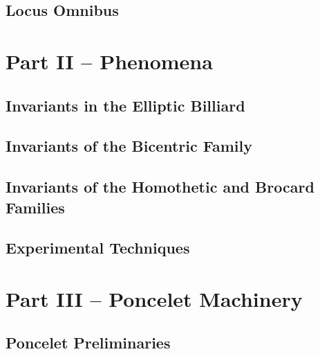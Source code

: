 \documentclass{book}
\begin{document}
\chapter{Locus Omnibus}
\label{chap:04-n3-loci}
%

%

\part{Part II --  Phenomena}

\chapter[Billiard Invariants]{Invariants in the Elliptic Billiard}
\label{chap:05-billiard}
%

\chapter[Bicentric Invariants]{Invariants of the Bicentric Family}
\label{chap:06-bicentric}
%

\chapter[Homothetic and Brocard Invariants]{Invariants of the Homothetic and Brocard Families}
\label{chap:07-homoth}
%

\chapter{Experimental Techniques}
\label{chap:08-experimental}
%

\part{Part III -- Poncelet Machinery}

\chapter{Poncelet Preliminaries}
\label{chap:02-poncelet-prelims}
\end{document}
